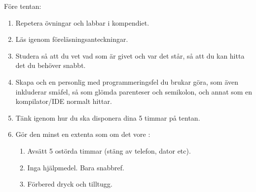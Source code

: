 

\begin{Slide}{Före tentan:}\SlideFontSmall
\begin{enumerate}
\item Repetera övningar och labbar i kompendiet. 
\item Läs igenom föreläsningsanteckningar.
\item Studera   så att du vet vad som är givet och var det står, så att du kan hitta det du behöver snabbt.
\item Skapa och  en personlig  med programmeringsfel du brukar göra, som även inkluderar småfel, så som glömda parenteser och semikolon, och annat som en kompilator/IDE normalt hittar.
\item Tänk igenom hur du ska disponera dina 5 timmar på tentan.
\item Gör den minst en extenta som om det vore : 
\begin{enumerate}\SlideFontTiny
\item Avsätt 5 ostörda timmar (stäng av telefon, dator etc).
\item Inga hjälpmedel. Bara snabbref.
\item Förbered dryck och tilltugg.
\end{enumerate}
\end{enumerate}
\end{Slide}

